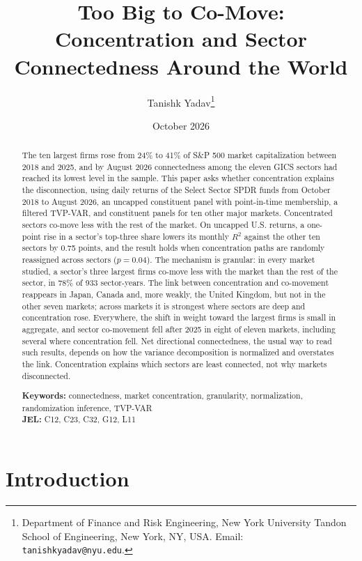 \documentclass[11pt]{article}
\title{Too Big to Co-Move:\\Concentration and Sector Connectedness Around the World}
\author{Tanishk Yadav\thanks{Department of Finance and Risk Engineering, New York University Tandon School of Engineering, New York, NY, USA. Email: \texttt{tanishkyadav@nyu.edu}.}}
\date{October 2026}
\begin{document}
\maketitle

\begin{abstract}
\noindent
The ten largest firms rose from 24\% to 41\% of S\&P 500 market capitalization between 2018 and 2025, and by August 2026 connectedness among the eleven GICS sectors had reached its lowest level in the sample. This paper asks whether concentration explains the disconnection, using daily returns of the Select Sector SPDR funds from October 2018 to August 2026, an uncapped constituent panel with point-in-time membership, a filtered TVP-VAR, and constituent panels for ten other major markets. Concentrated sectors co-move less with the rest of the market. On uncapped U.S. returns, a one-point rise in a sector's top-three share lowers its monthly $R^2$ against the other ten sectors by 0.75 points, and the result holds when concentration paths are randomly reassigned across sectors ($p=0.04$). The mechanism is granular: in every market studied, a sector's three largest firms co-move less with the market than the rest of the sector, in 78\% of 933 sector-years. The link between concentration and co-movement reappears in Japan, Canada and, more weakly, the United Kingdom, but not in the other seven markets; across markets it is strongest where sectors are deep and concentration rose. Everywhere, the shift in weight toward the largest firms is small in aggregate, and sector co-movement fell after 2025 in eight of eleven markets, including several where concentration fell. Net directional connectedness, the usual way to read such results, depends on how the variance decomposition is normalized and overstates the link. Concentration explains which sectors are least connected, not why markets disconnected.

\medskip
\noindent\textbf{Keywords:} connectedness, market concentration, granularity, normalization, randomization inference, TVP-VAR
\\\noindent\textbf{JEL:} C12, C23, C32, G12, L11
\end{abstract}

\newpage
\section{Introduction}
\end{document}
